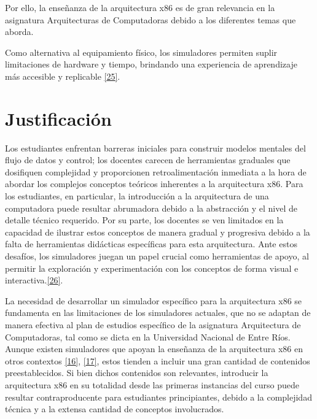 \documentclass[12pt,oneside]{templates/unerthesis}
\begin{document}
Por ello, la enseñanza de la arquitectura x86 es de gran relevancia en la asignatura Arquitecturas de Computadoras debido a los diferentes temas que aborda.

Como alternativa al equipamiento físico, los simuladores permiten suplir limitaciones de hardware y tiempo, brindando una experiencia de aprendizaje más accesible y replicable \protect\hyperlink{ref-skrien_cpu_2001}{{[}25{]}}.

\hypertarget{justificaciuxf3n}{%
\section{Justificación}\label{justificaciuxf3n}}

Los estudiantes enfrentan barreras iniciales para construir modelos mentales del flujo de datos y control; los docentes carecen de herramientas graduales que dosifiquen complejidad y proporcionen retroalimentación inmediata a la hora de abordar los complejos conceptos teóricos inherentes a la arquitectura x86. Para los estudiantes, en particular, la introducción a la arquitectura de una computadora puede resultar abrumadora debido a la abstracción y el nivel de detalle técnico requerido. Por su parte, los docentes se ven limitados en la capacidad de ilustrar estos conceptos de manera gradual y progresiva debido a la falta de herramientas didácticas específicas para esta arquitectura. Ante estos desafíos, los simuladores juegan un papel crucial como herramientas de apoyo, al permitir la exploración y experimentación con los conceptos de forma visual e interactiva.\protect\hyperlink{ref-mayer2009multimedia}{{[}26{]}}.

La necesidad de desarrollar un simulador específico para la arquitectura x86 se fundamenta en las limitaciones de los simuladores actuales, que no se adaptan de manera efectiva al plan de estudios específico de la asignatura Arquitectura de Computadoras, tal como se dicta en la Universidad Nacional de Entre Ríos. Aunque existen simuladores que apoyan la enseñanza de la arquitectura x86 en otros contextos \protect\hyperlink{ref-radivojevic_design_2011}{{[}16{]}}, \protect\hyperlink{ref-nikolic_survey_2009}{{[}17{]}}, estos tienden a incluir una gran cantidad de contenidos preestablecidos. Si bien dichos contenidos son relevantes, introducir la arquitectura x86 en su totalidad desde las primeras instancias del curso puede resultar contraproducente para estudiantes principiantes, debido a la complejidad técnica y a la extensa cantidad de conceptos involucrados.
\end{document}
